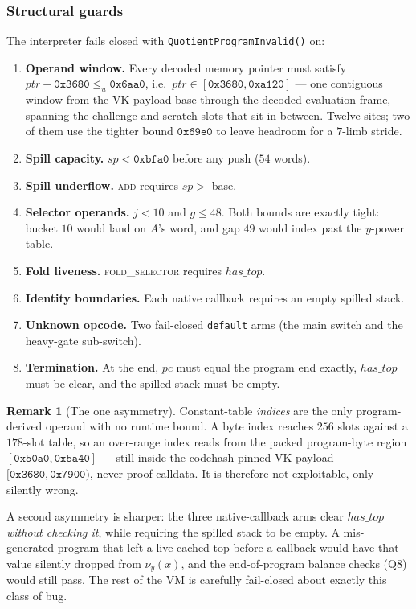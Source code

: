 \documentclass[11pt,a4paper]{article}
\newcommand{\code}[1]{\texttt{#1}}
\newcommand{\err}[1]{\textcolor{red!60!black}{\texttt{#1}}}
\newcommand{\opc}[1]{\textsc{#1}}
\theoremstyle{definition}
\newtheorem{remark}{Remark}[section]
\begin{document}
\subsubsection{Structural guards}

The interpreter fails closed with \err{QuotientProgramInvalid()} on:

\begin{enumerate}[label=\textbf{Q\arabic*.},leftmargin=1.5cm]
\item \textbf{Operand window.} Every decoded memory pointer must satisfy
      $\mathit{ptr} - \mathtt{0x3680} \le_u \mathtt{0x6aa0}$, i.e.\
      $\mathit{ptr} \in [\mathtt{0x3680},\mathtt{0xa120}]$ --- one contiguous
      window from the VK payload base through the decoded-evaluation frame,
      spanning the challenge and scratch slots that sit in between. Twelve sites; two of them use the
      tighter bound $\mathtt{0x69e0}$ to leave headroom for a $7$-limb stride.
\item \textbf{Spill capacity.} $\mathit{sp} < \mathtt{0xbfa0}$ before any push
      ($54$ words).
\item \textbf{Spill underflow.} \opc{add} requires $\mathit{sp} > $ base.
\item \textbf{Selector operands.} $j < 10$ and $g \le 48$. Both bounds are
      exactly tight: bucket $10$ would land on $A$'s word, and gap $49$ would
      index past the $y$-power table.
\item \textbf{Fold liveness.} \opc{fold\_selector} requires
      $\mathit{has\_top}$.
\item \textbf{Identity boundaries.} Each native callback requires an empty
      spilled stack.
\item \textbf{Unknown opcode.} Two fail-closed \code{default} arms (the main
      switch and the heavy-gate sub-switch).
\item \textbf{Termination.} At the end, $\mathit{pc}$ must equal the program
      end exactly, $\mathit{has\_top}$ must be clear, and the spilled stack
      must be empty.
\end{enumerate}

\begin{remark}[The one asymmetry]
Constant-table \emph{indices} are the only program-derived operand with no
runtime bound. A byte index reaches $256$ slots against a $178$-slot table, so
an over-range index reads from the packed program-byte region
$[\mathtt{0x50a0},\mathtt{0x5a40}]$ --- still inside the
codehash-pinned VK payload $[\mathtt{0x3680},\mathtt{0x7900})$, never proof
calldata. It is therefore not exploitable, only silently wrong.

A second asymmetry is sharper: the three native-callback arms clear
$\mathit{has\_top}$ \emph{without checking it}, while requiring the spilled
stack to be empty. A mis-generated program that left a live cached top before a
callback would have that value silently dropped from $\nu_y(x)$, and the
end-of-program balance checks (Q8) would still pass. The rest of the VM is
carefully fail-closed about exactly this class of bug.
\end{remark}
\end{document}
